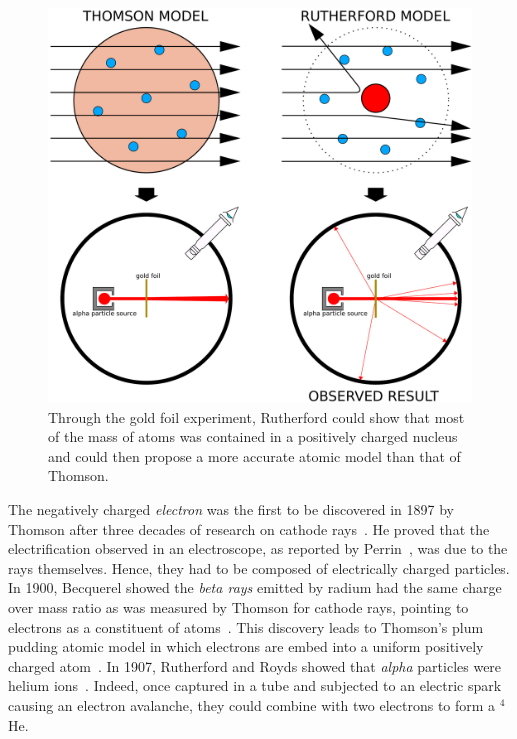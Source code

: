 	\begin{figure}[H]
		\centering
		\includegraphics[width=\plotwidth]{fig/chapt2/Thomson_Rutherford_atoms.pdf}
		\caption{\label{fig:Atom_models} Through the gold foil experiment, Rutherford could show that most of the mass of atoms was contained in a positively charged nucleus and could then propose a more accurate atomic model than that of Thomson.}
	\end{figure}
	
	The negatively charged \textit{electron} was the first to be discovered in 1897 by Thomson after three decades of research on cathode rays~\cite{THOMSON1897}. He proved that the electrification observed in an electroscope, as reported by Perrin~\cite{PERRIN1895}, was due to the rays themselves. Hence, they had to be composed of electrically charged particles. In 1900, Becquerel showed the \textit{beta rays} emitted by radium had the same charge over mass ratio as was measured by Thomson for cathode rays, pointing to electrons as a constituent of atoms~\cite{BECQUEREL1900}. This discovery leads to Thomson's plum pudding atomic model in which electrons are embed into a uniform positively charged atom~\cite{THOMSON1904}. In 1907, Rutherford and Royds showed that \textit{alpha} particles were helium ions~\cite{RUTHERFORD1908}. Indeed, once captured in a tube and subjected to an electric spark causing an electron avalanche, they could combine with two electrons to form a $^4$He.
	
